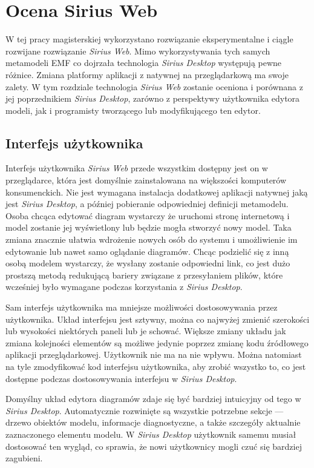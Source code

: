 \chapter{Ocena Sirius Web}


W tej pracy magisterskiej wykorzystano rozwiązanie eksperymentalne i ciągle
rozwijane rozwiązanie \emph{Sirius Web}.
Mimo wykorzystywania tych samych metamodeli \gls{EMF} co dojrzała technologia
\emph{Sirius Desktop} występują pewne różnice. Zmiana platformy aplikacji z
natywnej na przeglądarkową ma swoje zalety. W tym rozdziale technologia
\emph{Sirius Web} zostanie oceniona i porównana z jej poprzednikiem
\emph{Sirius Desktop}, zarówno z perspektywy użytkownika edytora modeli, jak i
programisty tworzącego lub modyfikującego ten edytor.

\section{Interfejs użytkownika}

Interfejs użytkownika \emph{Sirius Web} przede wszystkim dostępny jest on w
przeglądarce, która jest domyślnie zainstalowana
na większości komputerów konsumenckich. Nie jest wymagana instalacja dodatkowej
aplikacji natywnej jaką jest \emph{Sirius Desktop}, a później pobieranie
odpowiedniej definicji metamodelu. Osoba chcąca edytować diagram wystarczy że
uruchomi stronę internetową i model zostanie jej wyświetlony lub będzie mogła
stworzyć nowy model. Taka zmiana
znacznie ułatwia wdrożenie nowych osób do systemu i umożliwienie im edytowanie
lub nawet samo oglądanie diagramów. Chcąc podzielić się z inną osobą modelem
wystarczy, że wysłany zostanie odpowiedni link, co jest dużo prostszą metodą
redukującą bariery związane z przesyłaniem plików, które wcześniej było
wymagane podczas korzystania z \emph{Sirius Desktop}.

Sam interfejs użytkownika ma mniejsze możliwości dostosowywania przez
użytkownika. Układ
interfejsu jest sztywny, można co najwyżej zmienić szerokości lub wysokości
niektórych paneli lub je schować. Większe zmiany układu jak zmiana kolejności
elementów są możliwe jedynie poprzez zmianę kodu źródłowego aplikacji
przeglądarkowej. Użytkownik nie ma na nie wpływu. Można natomiast na tyle
zmodyfikować kod interfejsu użytkownika, aby zrobić wszystko to, co jest
dostępne podczas dostosowywania interfejsu w \emph{Sirius Desktop}.

Domyślny układ edytora diagramów zdaje się być bardziej intuicyjny od tego w
\emph{Sirius Desktop}. Automatycznie rozwinięte są wszystkie potrzebne sekcje
--- drzewo obiektów modelu, informacje diagnostyczne, a także szczegóły
aktualnie zaznaczonego elementu modelu. W \emph{Sirius Desktop} użytkownik
samemu musiał dostosować ten wygląd, co sprawia, że nowi użytkownicy mogli czuć
się bardziej zagubieni.

